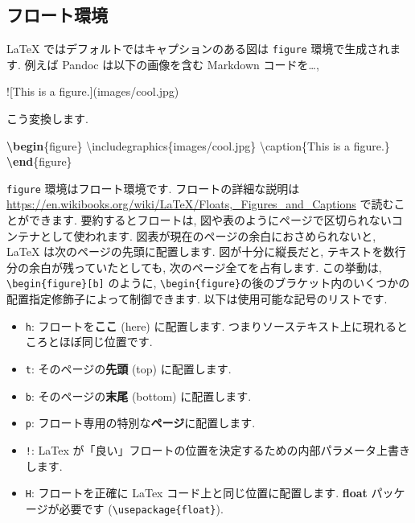 \documentclass[
  11pt,
]{bxjsreport}
\newenvironment{Shaded}{\begin{snugshade}}{\end{snugshade}}
\newcommand{\AlertTok}[1]{\textcolor[rgb]{0.94,0.16,0.16}{#1}}
\newcommand{\BuiltInTok}[1]{#1}
\newcommand{\ExtensionTok}[1]{#1}
\newcommand{\FunctionTok}[1]{\textcolor[rgb]{0.00,0.00,0.00}{#1}}
\newcommand{\KeywordTok}[1]{\textcolor[rgb]{0.13,0.29,0.53}{\textbf{#1}}}
\newcommand{\NormalTok}[1]{#1}
\providecommand{\tightlist}{%
  \setlength{\itemsep}{0pt}\setlength{\parskip}{0pt}}
\begin{document}
\hypertarget{floating-environment}{%
\subsection{フロート環境}\label{floating-environment}}

LaTeX ではデフォルトではキャプションのある図は \texttt{figure} 環境で生成されます. 例えば Pandoc は以下の画像を含む Markdown コードを\ldots,

\begin{Shaded}
\begin{Highlighting}[]
\AlertTok{![This is a figure.](images/cool.jpg)}
\end{Highlighting}
\end{Shaded}

こう変換します.

\begin{Shaded}
\begin{Highlighting}[]
\KeywordTok{\textbackslash{}begin}\NormalTok{\{}\ExtensionTok{figure}\NormalTok{\}}
  \BuiltInTok{\textbackslash{}includegraphics}\NormalTok{\{}\ExtensionTok{images/cool.jpg}\NormalTok{\}}
  \FunctionTok{\textbackslash{}caption}\NormalTok{\{This is a figure.\}}
\KeywordTok{\textbackslash{}end}\NormalTok{\{}\ExtensionTok{figure}\NormalTok{\}}
\end{Highlighting}
\end{Shaded}

\texttt{figure} 環境はフロート環境です. フロートの詳細な説明は \url{https://en.wikibooks.org/wiki/LaTeX/Floats,_Figures_and_Captions} で読むことができます. 要約するとフロートは, 図や表のようにページで区切られないコンテナとして使われます. 図表が現在のページの余白におさめられないと, LaTeX は次のページの先頭に配置します. 図が十分に縦長だと, テキストを数行分の余白が残っていたとしても, 次のページ全てを占有します. この挙動は, \texttt{\textbackslash{}begin\{figure\}{[}b{]}} のように, \texttt{\textbackslash{}begin\{figure\}}の後のブラケット内のいくつかの配置指定修飾子によって制御できます. 以下は使用可能な記号のリストです.

\begin{itemize}
\tightlist
\item
  \texttt{h}: フロートを\textbf{ここ} (here) に配置します. つまりソーステキスト上に現れるところとほぼ同じ位置です.
\item
  \texttt{t}: そのページの\textbf{先頭} (top) に配置します.
\item
  \texttt{b}: そのページの\textbf{末尾} (bottom) に配置します.
\item
  \texttt{p}: フロート専用の特別な\textbf{ページ}に配置します.
\item
  \texttt{!}: LaTex が「良い」フロートの位置を決定するための内部パラメータ上書きします.
\item
  \texttt{H}: フロートを正確に LaTex コード上と同じ位置に配置します. \textbf{float} パッケージが必要です (\texttt{\textbackslash{}usepackage\{float\}}).
\end{itemize}
\end{document}
